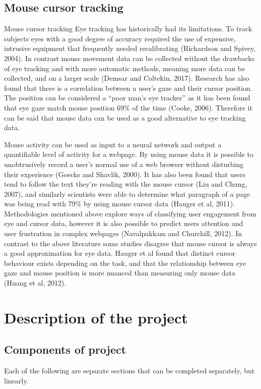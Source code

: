 \documentclass{article}
\begin{document}
\subsection{Mouse cursor tracking}
Mouse cursor tracking
Eye tracking has historically had its limitations. 
To track subjects eyes with a good degree of accuracy required the use of expensive, intrusive equipment that frequently needed recalibrating (Richardson and Spivey, 2004). 
In contrast mouse movement data can be collected without the drawbacks of eye tracking and with more automatic methods, meaning more data can be collected, and on a larger scale (Demsar and Coltekin, 2017).
Research has also found that there is a correlation between a user’s gaze and their cursor position. 
The position can be considered a “poor man’s eye tracker” as it has been found that eye gaze match mouse position 69\% of the time (Cooke, 2006). 
Therefore it can be said that mouse data can be used as a good alternative to eye tracking data.

Mouse activity can be used as input to a neural network and output a quantifiable level of activity for a webpage. 
By using mouse data it is possible to unobtrusively record a user’s normal use of a web browser without disturbing their experience (Goecks and Shavlik, 2000). 
It has also been found that users tend to follow the text they’re reading with the mouse cursor (Liu and Chung, 2007), and similarly scientists were able to determine what paragraph of a page was being read with 79\% by using mouse cursor data (Hauger et al, 2011). 
Methodologies mentioned above explore ways of classifying user engagement from eye and cursor data, however it is also possible to predict users attention and user frustration in complex webpages (Navalpakkam and Churchill, 2012).
In contrast to the above literature some studies disagree that mouse cursor is always a good approximation for eye data. 
Hauger et al found that distinct cursor behaviour exists depending on the task, and that the relationship between eye gaze and mouse position is more nuanced than measuring only mouse data (Huang et al, 2012).


\section{Description of the project}

\subsection{Components of project}
Each of the following are separate sections that can be completed separately, but linearly.
\end{document}
